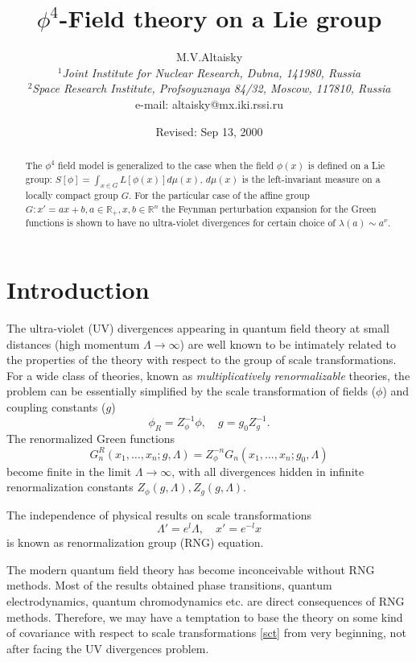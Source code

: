 \documentclass[a4paper,a4paper]{article}
\newcommand{\R}{\mathbb{R}}
\begin{document}
\title{$\phi^4$-Field theory on a Lie group}
\author{M.V.Altaisky \\
$^1${\em Joint Institute for Nuclear Research, Dubna, 141980, Russia} \\
$^2${\em Space  Research Institute, Profsoyuznaya 84/32, Moscow, 117810, 
Russia} \\ e-mail: altaisky@mx.iki.rssi.ru}
\date{Revised: Sep 13, 2000}
\maketitle
\begin{abstract}
The $\phi^4$ field model is generalized to the case when 
the field $\phi(x)$ is defined on a Lie group: 
$S[\phi]=\int_{x\in G} L[\phi(x)] d\mu(x)$,  
$d\mu(x)$ is the left-invariant measure on a locally compact group $G$. 
For the particular case of the affine group $G:x'=ax+b,a\in\R_+, x,b \in \R^n$ the Feynman 
perturbation expansion for the Green functions is shown to have no 
ultra-violet divergences for certain 
choice of $\lambda(a) \sim a^\nu$. 
\end{abstract}
\section{Introduction}
The ultra-violet (UV) divergences appearing in quantum field theory at small distances 
(high momentum $\Lambda\to\infty$) are well known to be 
intimately related to the properties of the theory with respect to 
the group of scale transformations. For a wide class of theories, 
known as {\em multiplicatively renormalizable} theories, the problem 
can be essentially simplified by the scale transformation of fields
($\phi$) and coupling constants ($g$)  
$$\phi_R = Z^{-1}_\phi \phi,\quad g = g_0 Z^{-1}_g.$$
The renormalized Green functions 
$$
G_n^R(x_1,\ldots,x_n;g,\Lambda) = Z_\phi^{-n}G_n(x_1,\ldots,x_n;g_0,\Lambda)
$$
become finite in the limit $\Lambda\to\infty$, with all divergences 
hidden in infinite renormalization constants 
$Z_\phi(g,\Lambda),Z_g(g,\Lambda)$. 

The independence of physical results on scale transformations 
\begin{equation} 
\Lambda'=e^l \Lambda, \quad x' = e^{-l}x
\label{sct}
\end{equation}
is known as renormalization group (RNG) equation. 

The modern quantum field theory has become inconceivable without 
RNG methods. Most of the results obtained phase transitions, 
quantum electrodynamics, quantum chromodynamics etc. are direct 
consequences of RNG methods. Therefore, we may have a temptation 
to base the theory on some kind of covariance with respect to 
scale transformations \eqref{sct} from very beginning, not after 
facing the UV divergences problem. 
\end{document}
